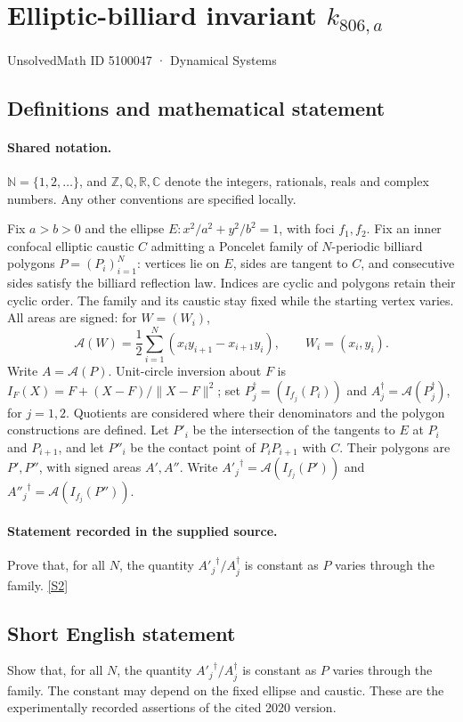\documentclass[11pt]{article}
\newcommand{\sref}[2]{\hyperlink{source:#1:#2}{[S#2]}}
\begin{document}
\setcounter{section}{5100046}
\section{Elliptic-billiard invariant $k_{806,a}$}\label{5100047}
{\small\sffamily UnsolvedMath ID 5100047 · Dynamical Systems}
\subsection{Definitions and mathematical statement}

\paragraph{Shared notation.}$\mathbb N=\{1,2,\ldots\}$, and $\mathbb Z,\mathbb Q,\mathbb R,\mathbb C$ denote the integers, rationals, reals and complex numbers. Any other conventions are specified locally.


Fix $a>b>0$ and the ellipse $E:x^2/a^2+y^2/b^2=1$, with foci $f_1,f_2$. Fix an inner confocal elliptic caustic $C$ admitting a Poncelet family of $N$-periodic billiard polygons $P=(P_i)_{i=1}^N$: vertices lie on $E$, sides are tangent to $C$, and consecutive sides satisfy the billiard reflection law. Indices are cyclic and polygons retain their cyclic order. The family and its caustic stay fixed while the starting vertex varies. All areas are signed: for $W=(W_i)$,
\[\mathcal A(W)=\frac12\sum_{i=1}^N(x_i y_{i+1}-x_{i+1}y_i),\qquad W_i=(x_i,y_i).\]
Write $A=\mathcal A(P)$. Unit-circle inversion about $F$ is $I_F(X)=F+(X-F)/\lVert X-F\rVert^2$; set $P_j^\dagger=(I_{f_j}(P_i))$ and $A_j^\dagger=\mathcal A(P_j^\dagger)$, for $j=1,2$. Quotients are considered where their denominators and the polygon constructions are defined. Let $P'_i$ be the intersection of the tangents to $E$ at $P_i$ and $P_{i+1}$, and let $P''_i$ be the contact point of $P_iP_{i+1}$ with $C$. Their polygons are $P',P''$, with signed areas $A',A''$. Write ${A'_j}^\dagger=\mathcal A(I_{f_j}(P'))$ and ${A''_j}^\dagger=\mathcal A(I_{f_j}(P''))$.
\paragraph{Statement recorded in the supplied source.}
Prove that, for all $N$, the quantity ${A'_j}^\dagger/A_j^\dagger$ is constant as $P$ varies through the family. \sref{5100047}{2}
\subsection{Short English statement}
Show that, for all $N$, the quantity ${A'_j}^\dagger/A_j^\dagger$ is constant as $P$ varies through the family. The constant may depend on the fixed ellipse and caustic. These are the experimentally recorded assertions of the cited 2020 version.
\end{document}
